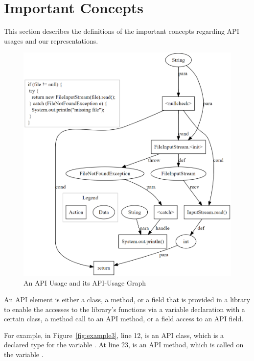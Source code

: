 \section{Important Concepts}
\label{sec:concepts}

This section describes the definitions of the important concepts
regarding API usages and our representations.

\begin{figure}[t] %
	\centering
	\includegraphics[width=0.9\linewidth]{aug-example}
        \vspace{-3pt}
	\caption{An API Usage and its API-Usage Graph}
	\label{fig:aug}
\end{figure}

\begin{Definition}
  An API element is either a class, a method, or a field that is
  provided in a library to enable the accesses to the library's
  functions via a variable declaration with a certain class, a method
  call to an API method, or a field access to an API field.
\end{Definition}

For example, in Figure~\ref{fig:example3}, line 12,  is
an API class, which is a declared type for the variable
. At line 23,  is an API
method, which is called on the variable .

